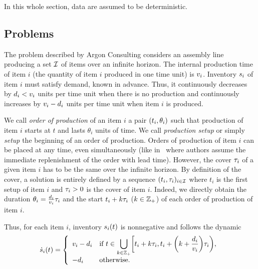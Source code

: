 In this whole section, data are assumed to be deterministic.


\subsection{Problems}
\label{sec:lot-size:single-line:deterministic:problems}

The problem described by Argon Consulting considers an assembly line producing a set $\mathcal{I}$ of items over an infinite horizon.
The internal production time of item $i$ (\ie the quantity of item $i$ produced in one time unit) is $v_i$.
Inventory $s_i$ of item $i$ must satisfy demand, known in advance.
Thus, it continuously decreases by $d_i<v_i$ units per time unit when there is no production and continuously increases by $v_i-d_i$ units per time unit when item $i$ is produced.


We call \emph{order of production} of an item $i$ a pair $\bracket{t_i,\theta_i}$ such that production of item $i$ starts at $t$ and lasts $\theta_i$ units of time.
We call \emph{production setup} or simply \emph{setup} the beginning of an order of production.
Orders of production of item $i$ can be placed at any time, even simultaneously (like in~\cite{Ohno2001} where authors assume the immediate replenishment of the order with lead time).
However, the cover $\tau_i$ of a given item $i$ has to be the same over the infinite horizon.
By definition of the cover, a solution is entirely defined by a sequence $\bracket{t_i,\cover_i}_{i\in\REF}$ where $t_i$ is the first setup of item $i$ and $\tau_i>0$ is the cover of item $i$.
Indeed, we directly obtain the duration $\theta_i=\frac{d_i}{v_i}\tau_i$ and the start $t_i+k\tau_i$ ($k\in\mathbb{Z}_+$) of each order of production of item $i$.

Thus, for each item $i$, inventory $\inventory_i\bracket{t}$ is nonnegative and follows the dynamic
\begin{equation}\label{eq:lot-size:single-line:deterministic:motivations:dynamic}
  \dot{\inventory}_i\bracket{t} =
  \left\{
  \begin{array}{ll}
  \rate_i-\demand_i
  & \ds\mbox{if}\ t\in\bigcup_{k\in\ZZ_+} \left[t_i+k\cover_i,t_i+\bracket{k+\frac{\demand_i}{\rate_i}}\cover_i\right),
  \\
  -\demand_i
  & \mbox{otherwise}.
  \end{array}
  \right.
\end{equation}


